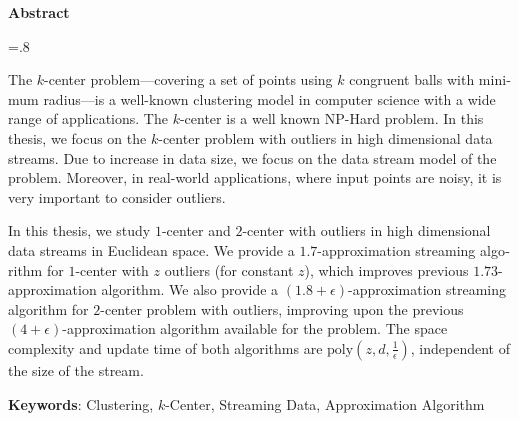 


\pagestyle{empty}

\begin{latin}

\begin{center}
\textbf{Abstract}
\end{center}
\baselineskip=.8\baselineskip

The $k$-center problem---covering a set of points using $k$ congruent balls with minimum radius---is a well-known clustering model in computer science with a wide range of applications. The $k$-center is a well known NP-Hard problem. In this thesis, we focus on the $k$-center problem with outliers in high dimensional data streams. Due to increase in data size, we focus on the data stream model of the problem. Moreover, in real-world applications, where input points are noisy, it is very important to consider outliers.

In this thesis, we study $1$-center and $2$-center with outliers in high dimensional data streams in Euclidean space. We provide a $1.7$-approximation streaming algorithm for $1$-center with $z$ outliers (for constant $z$), which improves previous $1.73$-approximation algorithm. We also provide a $(1.8 + \epsilon)$-approximation streaming algorithm for $2$-center problem with outliers, improving upon the previous $(4 + \epsilon)$-approximation algorithm available for the problem. The space complexity and update time of both algorithms are $\text{poly}(z, d, \frac{1}{\epsilon})$, independent of the size of the stream.

\bigskip\noindent\textbf{Keywords}:
Clustering, $k$-Center, Streaming Data, Approximation Algorithm

\end{latin}

\newpage
